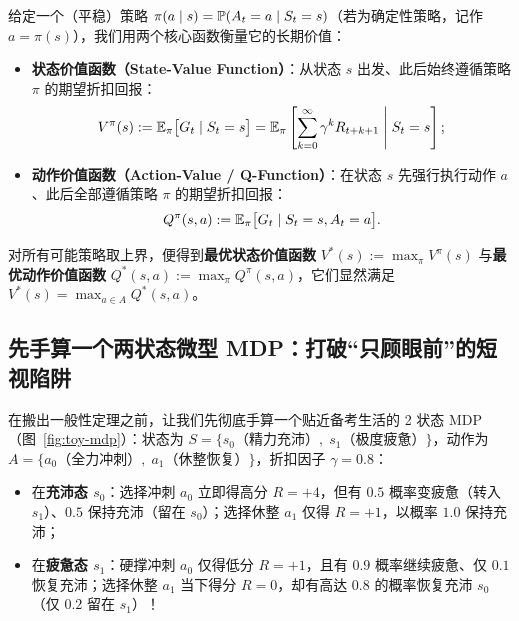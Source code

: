 给定一个（平稳）策略 $\pi(a \mid s) = \mathbb{P}(A_t = a \mid S_t = s)$（若为确定性策略，记作 $a = \pi(s)$），我们用两个核心函数衡量它的长期价值：
\begin{itemize}
  \item \textbf{状态价值函数（State-Value Function）}：从状态 $s$ 出发、此后始终遵循策略 $\pi$ 的期望折扣回报：
  \[
    V^\pi(s) := \mathbb{E}_\pi\big[G_t \mid S_t = s\big] = \mathbb{E}_\pi\left[\sum_{k=0}^{\infty} \gamma^k R_{t+k+1} \;\middle|\; S_t = s\right];
  \]
  \item \textbf{动作价值函数（Action-Value / Q-Function）}：在状态 $s$ 先强行执行动作 $a$、此后全部遵循策略 $\pi$ 的期望折扣回报：
  \[
    Q^\pi(s, a) := \mathbb{E}_\pi\big[G_t \mid S_t = s, A_t = a\big].
  \]
\end{itemize}
对所有可能策略取上界，便得到\textbf{最优状态价值函数} $V^*(s) := \max_\pi V^\pi(s)$ 与\textbf{最优动作价值函数} $Q^*(s, a) := \max_\pi Q^\pi(s, a)$，它们显然满足 $V^*(s) = \max_{a \in A} Q^*(s, a)$。

\subsection{先手算一个两状态微型 MDP：打破“只顾眼前”的短视陷阱}

在搬出一般性定理之前，让我们先彻底手算一个贴近备考生活的 2 状态 MDP（图~\ref{fig:toy-mdp}）：状态为 $S = \{s_0\text{（精力充沛）},\; s_1\text{（极度疲惫）}\}$，动作为 $A = \{a_0\text{（全力冲刺）},\; a_1\text{（休整恢复）}\}$，折扣因子 $\gamma = 0.8$：
\begin{itemize}
  \item 在\textbf{充沛态 $s_0$}：选择冲刺 $a_0$ 立即得高分 $R=+4$，但有 $0.5$ 概率变疲惫（转入 $s_1$）、$0.5$ 保持充沛（留在 $s_0$）；选择休整 $a_1$ 仅得 $R=+1$，以概率 $1.0$ 保持充沛；
  \item 在\textbf{疲惫态 $s_1$}：硬撑冲刺 $a_0$ 仅得低分 $R=+1$，且有 $0.9$ 概率继续疲惫、仅 $0.1$ 恢复充沛；选择休整 $a_1$ 当下得分 $R=0$，却有高达 $0.8$ 的概率恢复充沛 $s_0$（仅 $0.2$ 留在 $s_1$）！
\end{itemize}

